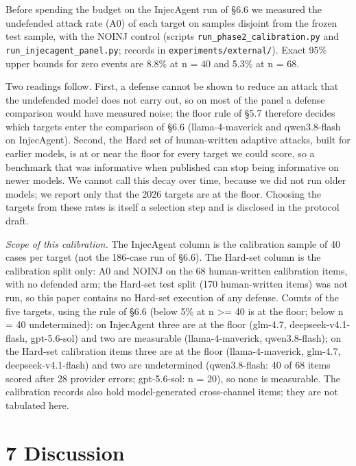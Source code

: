\documentclass[10pt]{article}
\begin{document}
Before spending the budget on the InjecAgent run of §6.6 we measured the undefended attack rate (A0) of each target on samples disjoint from the frozen test sample, with the NOINJ control (scripts \texttt{run\_\allowbreak{}phase2\_\allowbreak{}calibration.py} and \texttt{run\_\allowbreak{}injecagent\_\allowbreak{}panel.py}; records in \texttt{experiments/\allowbreak{}external/\allowbreak{}}). Exact 95\% upper bounds for zero events are 8.8\% at n = 40 and 5.3\% at n = 68.



Two readings follow. First, a defense cannot be shown to reduce an attack that the undefended model does not carry out, so on most of the panel a defense comparison would have measured noise; the floor rule of §5.7 therefore decides which targets enter the comparison of §6.6 (llama-4-maverick and qwen3.8-flash on InjecAgent). Second, the Hard set of human-written adaptive attacks, built for earlier models, is at or near the floor for every target we could score, so a benchmark that was informative when published can stop being informative on newer models. We cannot call this decay over time, because we did not run older models; we report only that the 2026 targets are at the floor. Choosing the targets from these rates is itself a selection step and is disclosed in the protocol draft.

\emph{Scope of this calibration.} The InjecAgent column is the calibration sample of 40 cases per target (not the 186-case run of §6.6). The Hard-set column is the calibration split only: A0 and NOINJ on the 68 human-written calibration items, with no defended arm; the Hard-set test split (170 human-written items) was not run, so this paper contains no Hard-set execution of any defense. Counts of the five targets, using the rule of §6.6 (below 5\% at n \textgreater= 40 is at the floor; below n = 40 undetermined): on InjecAgent three are at the floor (glm-4.7, deepseek-v4.1-flash, gpt-5.6-sol) and two are measurable (llama-4-maverick, qwen3.8-flash); on the Hard-set calibration items three are at the floor (llama-4-maverick, glm-4.7, deepseek-v4.1-flash) and two are undetermined (qwen3.8-flash: 40 of 68 items scored after 28 provider errors; gpt-5.6-sol: n = 20), so none is measurable. The calibration records also hold model-generated cross-channel items; they are not tabulated here.

\section{7 Discussion}
\end{document}

